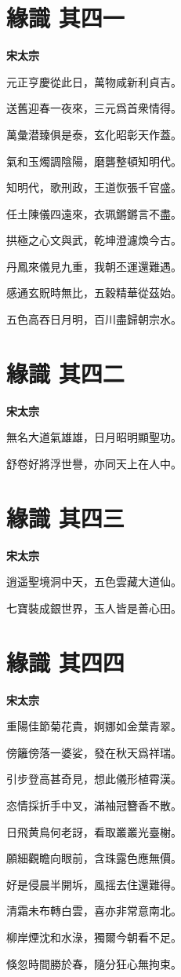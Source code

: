 \documentclass[12pt,a4paper]{ctexbook}
\begin{document}
\section{緣識  其四一}
\textbf{宋太宗}\par\vspace{0.5em}
元正亨慶從此日，萬物咸新利貞吉。\par
送舊迎春一夜來，三元爲首衆情得。\par
萬彙潜臻俱是泰，玄化昭彰天作蓋。\par
氣和玉燭調陰陽，磨礱整頓知明代。\par
知明代，歌刑政，王道恢張千官盛。\par
任土陳儀四遠來，衣珮鏘鏘言不盡。\par
拱極之心文與武，乾坤澄濾煥今古。\par
丹鳳來儀見九重，我朝丕運還難遇。\par
感通玄貺時無比，五穀精華從茲始。\par
五色高吞日月明，百川盡歸朝宗水。\par

\section{緣識  其四二}
\textbf{宋太宗}\par\vspace{0.5em}
無名大道氣雄雄，日月昭明顯聖功。\par
舒卷好將浮世譽，亦同天上在人中。\par

\section{緣識  其四三}
\textbf{宋太宗}\par\vspace{0.5em}
逍遥聖境洞中天，五色雲藏大道仙。\par
七寶裝成銀世界，玉人皆是善心田。\par

\section{緣識  其四四}
\textbf{宋太宗}\par\vspace{0.5em}
重陽佳節菊花貴，婀娜如金葉青翠。\par
傍籬傍落一婆娑，發在秋天爲祥瑞。\par
引步登高甚奇見，想此儀形植霄漢。\par
恣情採折手中叉，滿袖冠簪香不散。\par
日飛黄鳥何老訝，看取叢叢光臺榭。\par
願細觀瞻向眼前，含珠露色應無價。\par
好是侵晨半開坼，風摇去住還難得。\par
清霜未布轉白雲，喜亦非常意南北。\par
柳岸煙沈和水淥，獨爾今朝看不足。\par
倏忽時間勝於春，隨分狂心無拘束。\par
\end{document}
